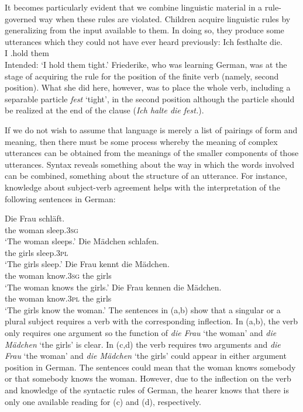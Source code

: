 It becomes particularly evident that we combine linguistic material in a rule-governed way when
these rules are violated. Children acquire linguistic rules by generalizing from
the input available to them. In doing so, they produce some utterances which they could not
have ever heard previously: 
\ea
\settowidth{}
\gll Ich festhalte die. \\
     I \particle.hold them\\
\glt Intended: `I hold them tight.'
\z
Friederike, who was learning German, was at the stage of acquiring the rule for the position of the finite
verb (namely, second position). What she did here, however, was to place the whole verb, including a
separable particle \emph{fest} `tight', in the second position although the particle should be realized at the end of
the clause (\emph{Ich halte die fest.}).

If we do not wish to assume that language is merely a list of pairings of form and meaning, then
there must be some process whereby the meaning of complex utterances can be obtained from the
meanings of the smaller components of those utterances. Syntax reveals something about the way in which the
words involved can be combined, something about the structure of an utterance. For instance,
knowledge about subject-verb agreement helps with the interpretation of the following sentences in German:

\eal
\label{Beispiel-mit-Kongruenz}
\ex 
\gll Die Frau schläft.\\
     the woman sleep.\textsc{3sg}\\
\glt `The woman sleeps.'
\ex 
\gll Die Mädchen schlafen.\\
     the girls sleep.\textsc{3pl}\\
\glt `The girls sleep.'
\ex 
\gll Die Frau kennt die Mädchen.\\
     the woman know.\textsc{3sg} the girls\\
\glt `The woman knows the girls.'
\ex 
\gll Die Frau kennen die Mädchen.\\
     the woman know.\textsc{3pl} the girls\\
\glt `The girls know the woman.'
\zl
The sentences in (a,b) show that a singular or a plural subject requires a verb with the corresponding inflection. 
In (a,b), the verb only requires one argument so the function of
\emph{die Frau} `the woman' and \emph{die Mädchen} `the girls' is clear.
In (c,d) the verb requires two arguments and \emph{die Frau} `the woman' and \emph{die
  Mädchen} `the girls'
could appear in either argument position in German. The sentences could mean that the woman 
knows somebody or that somebody knows the woman. However, due to the inflection on the verb and
knowledge of the syntactic rules of German, the hearer knows that there is only one available
reading for (c) and (d), respectively.
 
